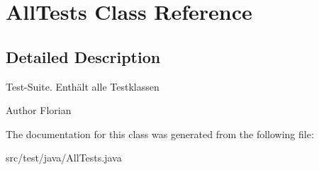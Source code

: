 \hypertarget{classAllTests}{\section{\-All\-Tests \-Class \-Reference}
\label{classAllTests}
}


\subsection{\-Detailed \-Description}
\-Test-\/\-Suite. \-Enthält alle \-Testklassen

\begin{DoxyAuthor}{\-Author}
\-Florian 
\end{DoxyAuthor}


\-The documentation for this class was generated from the following file\-:\begin{DoxyCompactItemize}
\item 
src/test/java/\-All\-Tests.\-java\end{DoxyCompactItemize}
